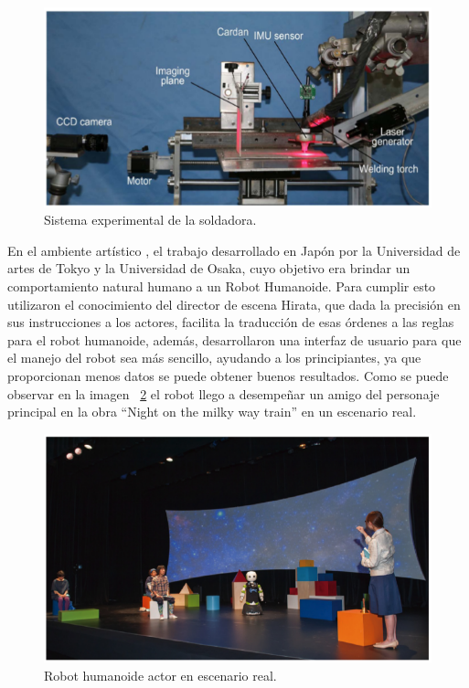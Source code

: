 \begin{figure}[H]
\centering
\includegraphics[width=0.8\columnwidth]{CapituloI/Imagenes/Welding.png}
\caption{Sistema experimental de la soldadora.}
\label{fig:syswelding}
\end{figure} 
 

En el ambiente artístico \cite{Nishiguchi2017}, el trabajo desarrollado en
 Japón por la Universidad de artes de Tokyo y la Universidad de Osaka, cuyo
 objetivo era brindar un comportamiento natural humano a un Robot Humanoide.
 Para cumplir esto utilizaron el conocimiento del director de escena Hirata,
 que dada la precisión en sus instrucciones a los actores, facilita la
 traducción de esas órdenes a las reglas para el robot humanoide, además,
 desarrollaron una interfaz de usuario para que el manejo del robot sea más
 sencillo, ayudando a los principiantes, ya que proporcionan menos datos se
 puede obtener buenos resultados. Como se puede observar en la imagen
 ~\ref{fig:theatricalrob} el robot llego a desempeñar un amigo del
 personaje principal en la obra ``Night on the milky way train'' en un
 escenario real.


\begin{figure}[H]
\centering
\includegraphics[width=0.8\columnwidth]{CapituloI/Imagenes/Theatrical.png}
\caption{Robot humanoide actor en escenario real.}
\label{fig:theatricalrob}
\end{figure} 


